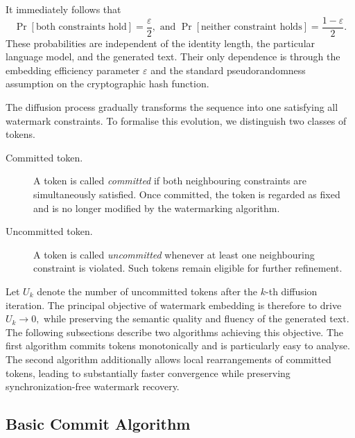 \documentclass[a4paper,11pt]{llncs}
\begin{document}
\vspace{3mm}
It immediately follows that
\[
\Pr[\text{both constraints hold}]
=
\frac{\varepsilon}{2},
\mbox{  and  }
\Pr[\text{neither constraint holds}]
=
\frac{1-\varepsilon}{2}.
\]
These probabilities are independent of the identity length, the
particular language model, and the generated text. Their only dependence
is through the embedding efficiency parameter $\varepsilon$ and the
standard pseudorandomness assumption on the cryptographic hash function.


The diffusion process gradually transforms the sequence into one
satisfying all watermark constraints. To formalise this evolution, we
distinguish two classes of tokens.
%
\begin{description}
\item[\rm Committed token.]
A token is called \emph{committed} if both neighbouring constraints are
simultaneously satisfied. Once committed, the token is regarded as fixed
and is no longer modified by the watermarking algorithm.
%
\item[\rm Uncommitted token.]
A token is called \emph{uncommitted} whenever at least one neighbouring
constraint is violated. Such tokens remain eligible for further
refinement.
\end{description}
Let
$
U_k
$
denote the number of uncommitted tokens after the $k$-th diffusion
iteration.
The principal objective of watermark embedding is therefore to drive
$
U_k
\longrightarrow
0,
$
while preserving the semantic quality and fluency of the generated text.
The following subsections describe two algorithms achieving
this objective. The first algorithm commits tokens monotonically and is
particularly easy to analyse. The second algorithm additionally allows
local rearrangements of committed tokens, leading to substantially faster
convergence while preserving synchronization-free watermark recovery.

\subsection{Basic Commit Algorithm}
\label{sec:basic-commit}
\end{document}

